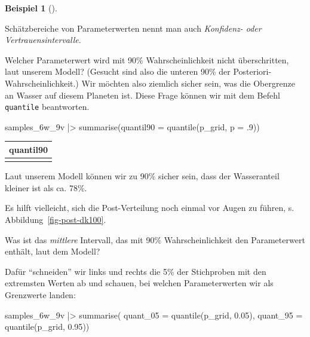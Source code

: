 \documentclass[
  ngerman,
  letterpaper,
  twoside,
  open=any]{scrbook}
\newenvironment{Shaded}{\begin{snugshade}}{\end{snugshade}}
\newcommand{\AttributeTok}[1]{\textcolor[rgb]{0.40,0.45,0.13}{#1}}
\newcommand{\DecValTok}[1]{\textcolor[rgb]{0.68,0.00,0.00}{#1}}
\newcommand{\FloatTok}[1]{\textcolor[rgb]{0.68,0.00,0.00}{#1}}
\newcommand{\FunctionTok}[1]{\textcolor[rgb]{0.28,0.35,0.67}{#1}}
\newcommand{\NormalTok}[1]{\textcolor[rgb]{0.00,0.23,0.31}{#1}}
\newcommand{\SpecialCharTok}[1]{\textcolor[rgb]{0.37,0.37,0.37}{#1}}
\newcounter{none} %
\theoremstyle{definition}
\newtheorem{example}{Beispiel}[chapter]
\theoremstyle{plain}
\theoremstyle{definition}
\theoremstyle{definition}
\theoremstyle{remark}
\begin{document}
\begin{example}[]
\begin{tcolorbox}
Schätzbereiche von Parameterwerten nennt man auch \emph{Konfidenz- oder
Vertrauensintervalle}\footnotemark{}.

\end{tcolorbox}


Welcher Parameterwert wird mit 90\% Wahrscheinlichkeit nicht
überschritten, laut unserem Modell? (Gesucht sind also die unteren 90\%
der Posteriori-Wahrscheinlichkeit.) Wir möchten also ziemlich sicher
sein, was die Obergrenze an Wasser auf diesem Planeten ist. Diese Frage
können wir mit dem Befehl \texttt{quantile} beantworten.

\begin{Shaded}
\begin{Highlighting}[]
\NormalTok{samples\_6w\_9v }\SpecialCharTok{|\textgreater{}} 
  \FunctionTok{summarise}\NormalTok{(}\AttributeTok{quantil90 =} \FunctionTok{quantile}\NormalTok{(p\_grid, }\AttributeTok{p =}\NormalTok{ .}\DecValTok{9}\NormalTok{))}
\end{Highlighting}
\end{Shaded}

{\def\LTcaptype{none} %
\begin{longtable}[]{@{}r@{}}
\toprule\noalign{}
quantil90 \\
\midrule\noalign{}
\endhead
\bottomrule\noalign{}
\endlastfoot
0.8 \\
\end{longtable}
}

Laut unserem Modell können wir zu 90\% sicher sein, dass der
Wasseranteil kleiner ist als ca. 78\%.

Es hilft vielleicht, sich die Post-Verteilung noch einmal vor Augen zu
führen, s. Abbildung~\ref{fig-post-dk100}.

Was ist das \emph{mittlere} Intervall, das mit 90\% Wahrscheinlichkeit
den Parameterwert enthält, laut dem Modell?

Dafür \enquote{schneiden} wir links und rechts die 5\% der Stichproben
mit den extremsten Werten ab und schauen, bei welchen Parameterwerten
wir als Grenzwerte landen:

\begin{Shaded}
\begin{Highlighting}[]
\NormalTok{samples\_6w\_9v }\SpecialCharTok{|\textgreater{}} 
  \FunctionTok{summarise}\NormalTok{(}
    \AttributeTok{quant\_05 =} \FunctionTok{quantile}\NormalTok{(p\_grid, }\FloatTok{0.05}\NormalTok{),}
    \AttributeTok{quant\_95 =} \FunctionTok{quantile}\NormalTok{(p\_grid, }\FloatTok{0.95}\NormalTok{))}
\end{Highlighting}
\end{Shaded}


\end{example}
\end{document}
